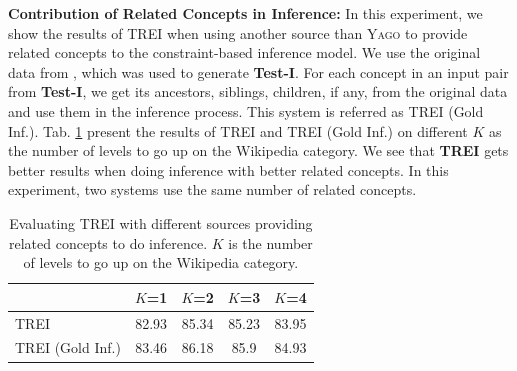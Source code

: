 {\bf Contribution of Related Concepts in Inference:} In this
experiment, we show the results of TREI when using another source than
\textsc{Yago} to provide related concepts to the constraint-based
inference model.  We use the original data from
\cite{pacsca-vandurme:2008:ACLMain}, which was used to generate {\bf
  Test-I}. For each concept in an input pair from {\bf Test-I}, we get
its ancestors, siblings, children, if any, from the original data and
use them in the inference process. This system is referred as TREI
(Gold Inf.). Tab. \ref{table:related-concepts} present the results of
TREI and TREI (Gold Inf.) on different $K$ as the number of levels to
go up on the Wikipedia category.
We see that {\bf TREI} gets better results when doing inference with
better related concepts. In this experiment, two systems use the same
number of related concepts.

\begin{table}[!t]
  \small
  \begin{center}
    \begin{tabular}{l|c|c|c|c}
      &    $K$=1  &    $K$=2  &    $K$=3  &    $K$=4  \\
      \hline
      TREI             &  82.93  &  85.34  &  85.23  &  83.95  \\
      TREI (Gold Inf.)  &  83.46  &  86.18  &   85.9  &  84.93  \\
    \end{tabular}
    \caption{Evaluating TREI with different sources providing related
      concepts to do inference. $K$ is the number of levels to go up
      on the Wikipedia category.}
    \label{table:related-concepts}
  \end{center}
\end{table}



